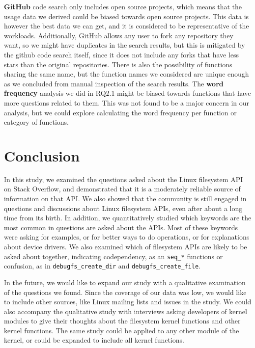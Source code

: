 \textbf{GitHub} code search only includes open source projects, which means that the usage data we derived could be biased towards open source projects. This data is however the best data we can get, and it is considered to be representative of the workloads. Additionally, GitHub allows any user to fork any repository they want, so we might have duplicates in the search results, but this is mitigated by the github code search itself, since it does not include any forks that have less stars than the original repositories. There is also the possibility of functions sharing the same name, but the function names we considered are unique enough as we concluded from manual inspection of the search results.
The \textbf{word frequency} analysis we did in RQ2.1 might be biased towards functions that have more questions related to them. This was not found to be a major concern in our analysis, but we could explore calculating the word frequency per function or category of functions.

\section{Conclusion}
In this study, we examined the questions asked about the Linux filesystem API on Stack Overflow, and demonstrated that it is a moderately reliable source of information on that API. We also showed that the community is still engaged in questions and discussions about Linux filesystem APIs, even after about a long time from its birth.
In addition, we quantitatively studied which keywords are the most common in questions are asked about the APIs. Most of these keywords were asking for examples, or for better ways to do operations, or for explanations about device drivers. We also examined which of filesystem APIs are likely to be asked about together, indicating codependency, as an \texttt{seq\_*} functions or confusion, as in \texttt{debugfs\_create\_dir} and  \texttt{debugfs\_create\_file}.

In the future, we would like to expand our study with a qualitative examination of the questions we found. Since the coverage of our data was low, we would like to include other sources, like Linux mailing lists and issues in the study. We could also accompany the qualitative study with interviews asking developers of kernel modules to give their thoughts about the filesystem kernel functions and other kernel functions. The same study could be applied to any other module of the kernel, or could be expanded to include all kernel functions.
